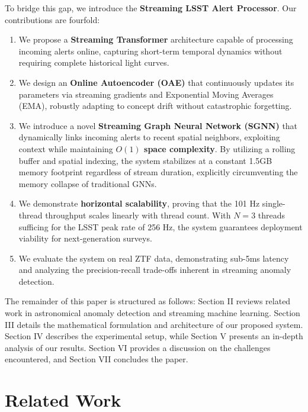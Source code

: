 \documentclass[10pt,journal,compsoc]{IEEEtran}
\begin{document}
To bridge this gap, we introduce the \textbf{Streaming LSST Alert Processor}. Our contributions are fourfold:
\begin{enumerate}
    \item We propose a \textbf{Streaming Transformer} architecture capable of processing incoming alerts online, capturing short-term temporal dynamics without requiring complete historical light curves.
    \item We design an \textbf{Online Autoencoder (OAE)} that continuously updates its parameters via streaming gradients and Exponential Moving Averages (EMA), robustly adapting to concept drift without catastrophic forgetting.
    \item We introduce a novel \textbf{Streaming Graph Neural Network (SGNN)} \cite{kipf2016semi} that dynamically links incoming alerts to recent spatial neighbors, exploiting context while maintaining \textbf{$O(1)$ space complexity}. By utilizing a rolling buffer and spatial indexing, the system stabilizes at a constant 1.5GB memory footprint regardless of stream duration, explicitly circumventing the memory collapse of traditional GNNs.
    \item We demonstrate \textbf{horizontal scalability}, proving that the 101 Hz single-thread throughput scales linearly with thread count. With $N=3$ threads sufficing for the LSST peak rate of 256 Hz, the system guarantees deployment viability for next-generation surveys.
    \item We evaluate the system on real ZTF \cite{bellm2019zwicky} data, demonstrating sub-5ms latency and analyzing the precision-recall trade-offs inherent in streaming anomaly detection.
\end{enumerate}

The remainder of this paper is structured as follows: Section II reviews related work in astronomical anomaly detection and streaming machine learning. Section III details the mathematical formulation and architecture of our proposed system. Section IV describes the experimental setup, while Section V presents an in-depth analysis of our results. Section VI provides a discussion on the challenges encountered, and Section VII concludes the paper.

\section{Related Work}
\end{document}
